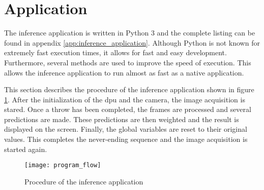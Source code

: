 \section{Application}
\label{sec:inference:app}

The inference application is written in Python 3 and the complete listing can be found in appendix \ref{app:inference_application}.
Although Python is not known for extremely fast execution times, it allows for fast and easy development.
Furthermore, several methods are used to improve the speed of execution.
This allows the inference application to run almost as fast as a native application.

This section describes the procedure of the inference application shown in figure \ref{fig:procedure_inference_app}.
After the initialization of the \acrshort{dpu} and the camera, the image acquisition is stared.
Once a throw has been completed, the frames are processed and several predictions are made.
These predictions are then weighted and the result is displayed on the screen.
Finally, the global variables are reset to their original values.
This completes the never-ending sequence and the image acquisition is started again.

\begin{figure}
  \centering
  \texttt{[image: program\_flow]} %
  \caption{Procedure of the inference application}
  \label{fig:procedure_inference_app}
\end{figure}


